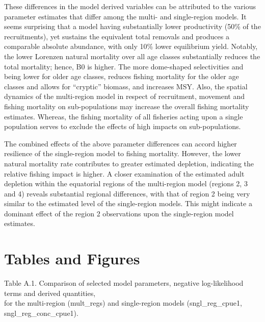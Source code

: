 \documentclass{SCreport}
\begin{document}
These differences in the model derived variables can be attributed to the
various parameter estimates that differ among the multi- and single-region
models. It seems surprising that a model having substantially lower productivity
(50\% of the recruitments), yet sustains the equivalent total removals and
produces a comparable absolute abundance, with only 10\% lower equilibrium
yield. Notably, the lower Lorenzen natural mortality over all age classes
substantially reduces the total mortality; hence, B0 is higher. The more
dome-shaped selectivities and being lower for older age classes, reduces fishing
mortality for the older age classes and allows for ``cryptic'' biomass, and
increases MSY. Also, the spatial dynamics of the multi-region model in respect
of recruitment, movement and fishing mortality on sub-populations may increase
the overall fishing mortality estimates. Whereas, the fishing mortality of all
fisheries acting upon a single population serves to exclude the effects of high
impacts on sub-populations.

The combined effects of the above parameter differences can accord higher
resilience of the single-region model to fishing mortality. However, the lower
natural mortality rate contributes to greater estimated depletion, indicating
the relative fishing impact is higher. A closer examination of the estimated
adult depletion within the equatorial regions of the multi-region model (regions
2, 3 and 4) reveals substantial regional differences, with that of region 2
being very similar to the estimated level of the single-region models. This
might indicate a dominant effect of the region 2 observations upon the
single-region model estimates.

\newpage

\section*{Tables and Figures}

\begin{small}
  Table A.1. Comparison of selected model parameters, negative log-likelihood
  terms and derived quantities,\\[-1ex]
  for the multi-region (mult\_regs) and single-region models (sngl\_reg\_cpue1,
  sngl\_reg\_conc\_cpue1).
\end{small}
\end{document}
